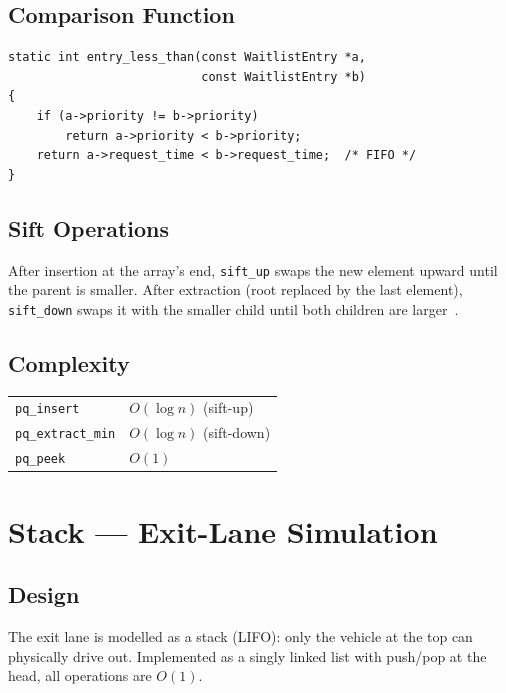 \documentclass[12pt, a4paper]{report}
\begin{document}
\subsection{Comparison Function}

\begin{lstlisting}[style=cstyle, caption={Two-key comparison for min-heap ordering}]
static int entry_less_than(const WaitlistEntry *a,
                           const WaitlistEntry *b)
{
    if (a->priority != b->priority)
        return a->priority < b->priority;
    return a->request_time < b->request_time;  /* FIFO */
}
\end{lstlisting}

\subsection{Sift Operations}

After insertion at the array's end, \texttt{sift\_up} swaps the new
element upward until the parent is smaller.  After extraction (root
replaced by the last element), \texttt{sift\_down} swaps it with the
smaller child until both children are larger~\cite{williams1964}.

\subsection{Complexity}

\begin{tabular}{ll}
  \texttt{pq\_insert}       & $O(\log n)$ (sift-up) \\
  \texttt{pq\_extract\_min} & $O(\log n)$ (sift-down) \\
  \texttt{pq\_peek}         & $O(1)$ \\
\end{tabular}

\section{Stack --- Exit-Lane Simulation}

\subsection{Design}

The exit lane is modelled as a stack (LIFO): only the vehicle at the top
can physically drive out.  Implemented as a singly linked list with
push/pop at the head, all operations are $O(1)$.
\end{document}

